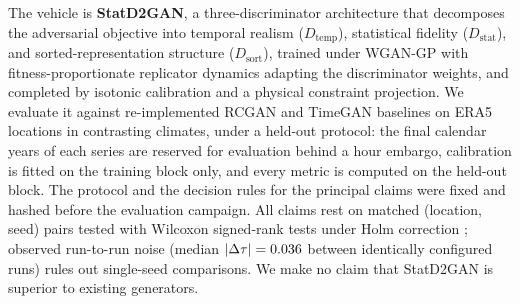 \documentclass[preprint,12pt]{elsarticle}
\newcommand{\abs}[1]{\left| #1 \right|}
\newcommand{\Dtemp}{D_{\mathrm{temp}}}
\newcommand{\Dstat}{D_{\mathrm{stat}}}
\newcommand{\Dsort}{D_{\mathrm{sort}}}
\begin{document}
The vehicle is \textbf{StatD2GAN}, a three-discriminator architecture
that decomposes the adversarial objective into temporal realism
($\Dtemp$), statistical fidelity ($\Dstat$), and sorted-representation
structure ($\Dsort$), trained under WGAN-GP \cite{gulrajani2017improved}
with fitness-proportionate replicator dynamics
\cite{taylor1978evolutionary} adapting the discriminator weights, and
completed by isotonic calibration \cite{barlow1972isotonic} and a
physical constraint projection.  We evaluate it against re-implemented
RCGAN \cite{esteban2017rcgan} and TimeGAN \cite{yoon2019timegan}
baselines on \nLocsProtoWord{} ERA5~\cite{hersbach2020era5} locations in contrasting climates,
under a held-out protocol: the final
\protoValYearsWord{} calendar years of each series are reserved for
evaluation behind a \protoEmbargoHours{} hour embargo, calibration is
fitted on the training block only, and every metric is computed on the
held-out block.  The protocol and the decision rules for the principal
claims were fixed and hashed before the evaluation campaign.  All claims
rest on \nPairs{} matched (location, seed) pairs tested with Wilcoxon
signed-rank tests \cite{wilcoxon1945} under Holm correction
\cite{holm1979}; observed run-to-run noise (median
$\abs{\Delta\tau} = \runNoiseDtau$ between identically configured runs)
rules out single-seed comparisons.  We make no claim that StatD2GAN is
superior to existing generators.
\end{document}
